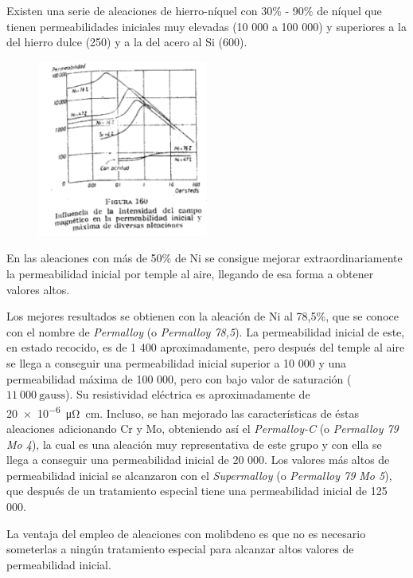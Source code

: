 \documentclass[12pt,a4paper]{article}
\begin{document}
Existen una serie de aleaciones de hierro-níquel con 30\% - 90\% de níquel que tienen permeabilidades iniciales muy elevadas (10 000 a 100 000) y superiores a la del hierro dulce (250) y a la del acero al Si (600).

\begin{figure}[H]    
    \centering         
    \includegraphics[width=0.5\textwidth]{IMAGENES LATEX/7.png}
\end{figure}

En las aleaciones con más de 50\% de Ni se consigue mejorar extraordinariamente la permeabilidad inicial por temple al aire, llegando de esa forma a obtener valores altos. 

Los mejores resultados se obtienen con la aleación de Ni al 78,5\%, que se conoce con el nombre de \textit{Permalloy} (o \textit{Permalloy 78,5}). La permeabilidad inicial de este, en estado recocido, es de 1 400 aproximadamente, pero después del temple al aire se llega a conseguir una permeabilidad inicial superior a 10 000 y una permeabilidad máxima de 100 000, pero con bajo valor de saturación ($11\ 000\ \mathrm{gauss}$). Su resistividad eléctrica es aproximadamente de \SI{20e-6}{\micro\ohm\centi\metre}. Incluso, se han mejorado las características de éstas aleaciones adicionando Cr y Mo, obteniendo así el \textit{Permalloy-C} (o \textit{Permalloy 79 Mo 4}), la cual es una aleación muy representativa de este grupo y con ella se llega a conseguir una permeabilidad inicial de 20 000. Los valores más altos de permeabilidad inicial se alcanzaron con el \textit{Supermalloy} (o \textit{Permalloy 79 Mo 5}), que después de un tratamiento especial tiene una permeabilidad inicial de 125 000.

La ventaja del empleo de aleaciones con molibdeno es que no es necesario someterlas a ningún tratamiento especial para alcanzar altos valores de permeabilidad inicial.
\end{document}
